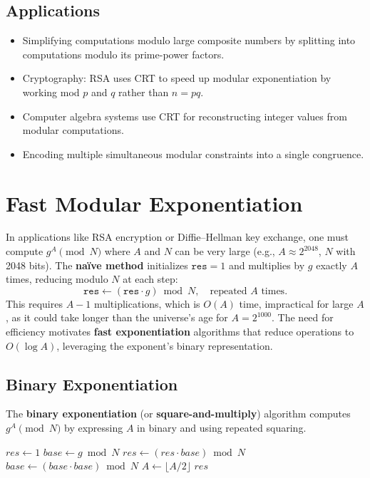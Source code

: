 \documentclass[12pt,openany]{book}
\theoremstyle{definition}
\theoremstyle{plain}
\theoremstyle{remark}
\begin{document}
\section{Applications}

\begin{itemize}
  \item Simplifying computations modulo large composite numbers by splitting into computations modulo its prime-power factors.
  \item Cryptography: RSA uses CRT to speed up modular exponentiation by working mod $p$ and $q$ rather than $n = p q$.
  \item Computer algebra systems use CRT for reconstructing integer values from modular computations.
  \item Encoding multiple simultaneous modular constraints into a single congruence.
\end{itemize}


\chapter{Fast Modular Exponentiation}
In applications like RSA encryption or Diffie–Hellman key exchange, one must compute $g^A \pmod{N}$ where $A$ and $N$ can be very large (e.g., $A \approx 2^{2048}$, $N$ with 2048 bits). The \textbf{naïve method} initializes $\texttt{res} = 1$ and multiplies by $g$ exactly $A$ times, reducing modulo $N$ at each step:
\[
\texttt{res} \gets (\texttt{res} \cdot g) \bmod N, \quad \text{repeated } A \text{ times}.
\]
This requires $A - 1$ multiplications, which is $O(A)$ time, impractical for large $A$, as it could take longer than the universe’s age for $A = 2^{1000}$. The need for efficiency motivates \textbf{fast exponentiation} algorithms that reduce operations to $O(\log A)$, leveraging the exponent’s binary representation.

\section{Binary Exponentiation}

The \textbf{binary exponentiation} (or \textbf{square-and-multiply}) algorithm computes $g^A \pmod{N}$ by expressing $A$ in binary and using repeated squaring.

\begin{algorithm}[H]
\caption{Fast Powering (Square-and-Multiply)}
\begin{algorithmic}[1]
  \State $res \gets 1$
  \State $base \gets g \bmod N$
      \State $res \gets (res \cdot base) \bmod N$
    \EndIf
    \State $base \gets (base \cdot base) \bmod N$
    \State $A \gets \lfloor A / 2 \rfloor$
  \EndWhile
  \State \Return $res$
\EndFunction
\end{algorithmic}
\end{algorithm}
\end{document}
